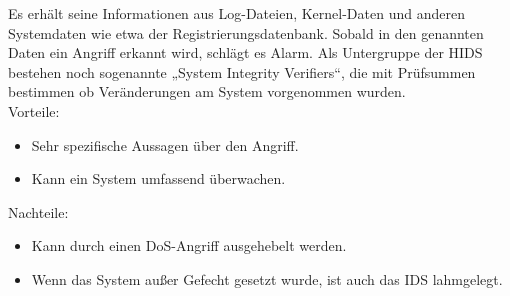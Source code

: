 \documentclass[11pt]{scrartcl}
\begin{document}
Es erhält seine Informationen aus Log-Dateien, Kernel-Daten und anderen Systemdaten wie etwa der Registrierungsdatenbank. Sobald in den genannten Daten ein Angriff erkannt wird, schlägt es Alarm. Als Untergruppe der HIDS bestehen noch sogenannte „System Integrity Verifiers“, die mit Prüfsummen bestimmen ob Veränderungen am System vorgenommen wurden.\\

Vorteile:
\begin{itemize}
\item Sehr spezifische Aussagen über den Angriff.
\item Kann ein System umfassend überwachen.
\end{itemize}
Nachteile:
\begin{itemize}
\item Kann durch einen DoS-Angriff ausgehebelt werden.
\item Wenn das System außer Gefecht gesetzt wurde, ist auch das IDS lahmgelegt. 
\end{itemize}
\cite{8}
\end{document}

